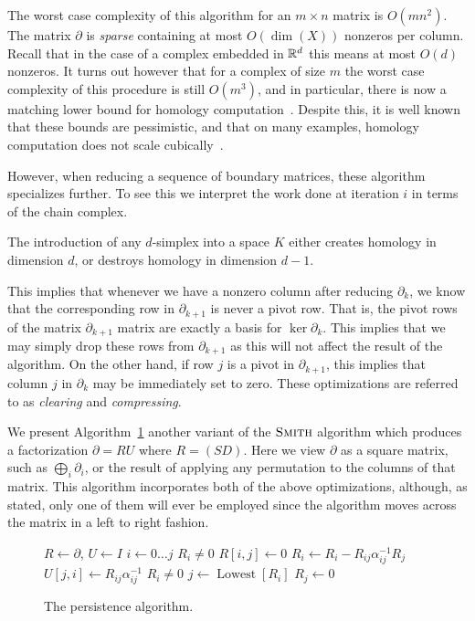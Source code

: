 The worst case complexity of this algorithm for an $m \times n$ matrix is $O(mn^2)$. The matrix $\partial$ is \emph{sparse} containing at most $O(\operatorname{dim}{(X)})$ nonzeros per column. Recall that in the case of a complex embedded in $\mathbb{R}^d$ this means at most $O(d)$ nonzeros. It turns out however that for a complex of size $m$ the worst case complexity of this procedure is still $O(m^3)$, and in particular, there is now a matching lower bound for homology computation~\cite{parsa}. Despite this, it is well known that these bounds are pessimistic, and that on many examples, homology computation does not scale cubically~\cite{elz-tps-02}. 

However, when reducing a sequence of boundary matrices, these algorithm specializes further. To see this we interpret the work done at iteration $i$ in terms of the chain complex. 
\begin{lemma}
The introduction of any $d$-simplex into a space $K$ either creates homology in dimension $d$, or destroys homology in dimension $d-1$.
\end{lemma}
This implies that whenever we have a nonzero column after reducing $\partial_k$, we know that the corresponding row in $\partial_{k+1}$ is never a pivot row. That is, the pivot rows of the matrix $\partial_{k+1}$ matrix are exactly a basis for $\ker{\partial_k}$. This implies that we may simply drop these rows from $\partial_{k+1}$ as this will not affect the result of the algorithm. On the other hand, if row $j$ is a pivot in $\partial_{k+1}$, this implies that column $j$ in $\partial_k$ may be immediately set to zero. These optimizations are referred to as \emph{clearing} and \emph{compressing}.

We present Algorithm~\ref{alg:elz} another variant of the $\textnormal{\scshape Smith}$ algorithm which produces a factorization $\partial = RU$ where $R = (SD)$. Here we view $\partial$ as a square matrix, such as $\bigoplus_i \partial_i$, or the result of applying any permutation to the columns of that matrix. This algorithm incorporates both of the above optimizations, although, as stated, only one of them will ever be employed since the algorithm moves across the matrix in a left to right fashion.
\begin{figure}[h]
\begin{codebox}
\li $R \gets \partial$, $U \gets I$
\li {}
\li \Do \For $i \gets 0 \ldots j$ 
\li \Do  \If $R_i \neq 0$ 
\li \Then $R[i,j] \gets 0$
\End
\li \Do {}
\li \Do
\li   $R_i \gets R_i - R_{ij}\alpha^{-1}_{ij}R_j$
\li   $U[j,i] \gets R_{ij}\alpha^{-1}_{ij}$
    \End
\li \If $R_i \neq 0$
\li \Then 
\li $j \gets \operatorname{Lowest}[R_i]$
\li $R_{j} \gets 0$
\End
\End
\end{codebox}
\caption{The persistence algorithm.}
\label{alg:elz}
\end{figure}

